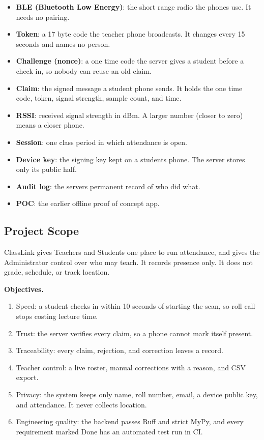 \begin{itemize}
\tightlist
\item
  \textbf{BLE (Bluetooth Low Energy)}: the short range radio the phones use. It needs no pairing.
\item
  \textbf{Token}: a 17 byte code the teacher phone broadcasts. It changes every 15 seconds and names no person.
\item
  \textbf{Challenge (nonce)}: a one time code the server gives a student before a check in, so nobody can reuse an old claim.
\item
  \textbf{Claim}: the signed message a student phone sends. It holds the one time code, token, signal strength, sample count, and time.
\item
  \textbf{RSSI}: received signal strength in dBm. A larger number (closer to zero) means a closer phone.
\item
  \textbf{Session}: one class period in which attendance is open.
\item
  \textbf{Device key}: the signing key kept on a student\textquotesingle s phone. The server stores only its public half.
\item
  \textbf{Audit log}: the server\textquotesingle s permanent record of who did what.
\item
  \textbf{POC}: the earlier offline proof of concept app.
\end{itemize}

\hypertarget{project-scope}{%
\subsection{Project Scope}\label{project-scope}}

ClassLink gives Teachers and Students one place to run attendance, and gives the Administrator control over who may teach. It records presence only. It does not grade, schedule, or track location.

\textbf{Objectives.}

\begin{enumerate}
\def\labelenumi{\arabic{enumi}.}
\tightlist
\item
  Speed: a student checks in within 10 seconds of starting the scan, so roll call stops costing lecture time.
\item
  Trust: the server verifies every claim, so a phone cannot mark itself present.
\item
  Traceability: every claim, rejection, and correction leaves a record.
\item
  Teacher control: a live roster, manual corrections with a reason, and CSV export.
\item
  Privacy: the system keeps only name, roll number, email, a device public key, and attendance. It never collects location.
\item
  Engineering quality: the backend passes Ruff and strict MyPy, and every requirement marked Done has an automated test run in CI.
\end{enumerate}

